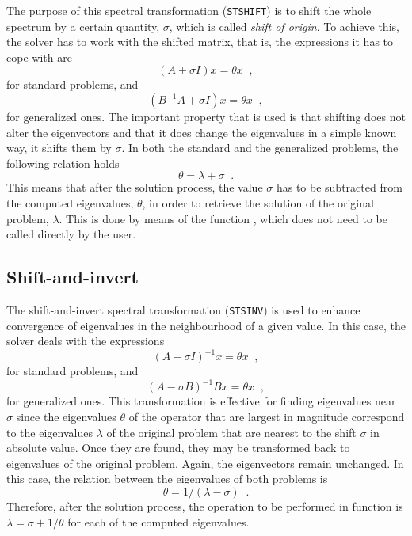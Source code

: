 	The purpose of this spectral transformation (\texttt{STSHIFT}) is to shift the whole spectrum by a certain quantity, $\sigma$, which is called \emph{shift of origin}. To achieve this, the solver has to work with the shifted matrix, that is, the expressions it has to cope with are
\begin{equation}(A+\sigma I)x=\theta x\;\;,\end{equation}
for standard problems, and 
\begin{equation}(B^{-1}A+\sigma I) x=\theta x\;\;,\end{equation}
for generalized ones. The important property that is used is that shifting does not alter the eigenvectors and that it does change the eigenvalues in a simple known way, it shifts them by $\sigma$. In both the standard and the generalized problems, the following relation holds 
\begin{equation}\theta=\lambda+\sigma\;\;.\end{equation}
This means that after the solution process, the value $\sigma$ has to be subtracted from the computed eigenvalues, $\theta$, in order to retrieve the solution of the original problem, $\lambda$. This is done by means of the function , which does not need to be called directly by the user.

\subsection{Shift-and-invert}

	The shift-and-invert spectral transformation (\texttt{STSINV}) is used to enhance convergence of eigenvalues in the neighbourhood of a given value. In this case, the solver deals with the expressions 
\begin{equation}(A-\sigma I)^{-1}x=\theta x\;\;,\end{equation}
for standard problems, and 
\begin{equation}(A-\sigma B)^{-1}B x=\theta x\;\;,\end{equation}
for generalized ones. 
This transformation is effective for finding eigenvalues near $\sigma$ since the eigenvalues $\theta$ of the operator that are largest in magnitude correspond to the eigenvalues $\lambda$ of the original problem that are nearest to the shift $\sigma$ in absolute value. Once they are found, they may be transformed back to eigenvalues of the original problem. Again, the eigenvectors remain unchanged.
In this case, the relation between the eigenvalues of both problems is
\begin{equation}\theta=1/(\lambda-\sigma)\;\;.\end{equation}
Therefore, after the solution process, the operation to be performed in function  is $\lambda=\sigma+1/\theta$ for each of the computed eigenvalues.

